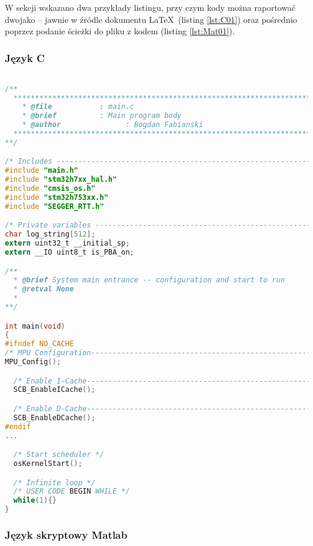 
W sekcji wskazano dwa przykłady listingu, przy czym kody można raportować dwojako \cite{carsten_heinz_listings_nodate} -- jawnie w źródle dokumentu \LaTeX\ (listing \ref{lst:C01}) oraz pośrednio poprzez podanie ścieżki do pliku z kodem (listing \ref{lst:Mat01}). 

\subsubsection{Język C}

\begin{lstlisting}[language=C, caption = {Przykładowy listing języka \textit{C}}, label = {lst:C01}]

/**
  ******************************************************************************
	* @file           : main.c
	* @brief          : Main program body
	* @author 				: Bogdan Fabianski
  ******************************************************************************
**/

/* Includes ------------------------------------------------------------------*/
#include "main.h"
#include "stm32h7xx_hal.h"
#include "cmsis_os.h"
#include "stm32h753xx.h"
#include "SEGGER_RTT.h"

/* Private variables ---------------------------------------------------------*/
char log_string[512];
extern uint32_t __initial_sp;
extern __IO uint8_t is_PBA_on;

/**
  * @brief System main entrance -- configuration and start to run
  * @retval None
  *
**/

int main(void)
{
#ifndef NO_CACHE
/* MPU Configuration----------------------------------------------------------*/
MPU_Config();

  /* Enable I-Cache---------------------------------------------------------*/
  SCB_EnableICache();

  /* Enable D-Cache---------------------------------------------------------*/
  SCB_EnableDCache();
#endif
...

  /* Start scheduler */
  osKernelStart();

  /* Infinite loop */
  /* USER CODE BEGIN WHILE */
  while(1){}
}

\end{lstlisting}

\subsubsection{Język skryptowy Matlab}




